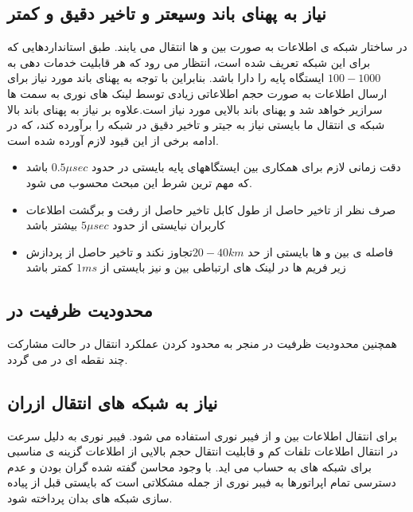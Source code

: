 \subsection{نیاز به پهنای باند وسیعتر و تاخیر
دقیق و کمتر}
در ساختار شبکه ی  اطلاعات به صورت  بین
  و   ها انتقال می یابند. طبق استانداردهایی
که برای این شبکه تعریف شده است، انتظار می رود که
هر  قابلیت خدمات دهی به $100-1000$
ایستگاه پایه را دارا باشد. بنابراین با توجه به پهنای
باند مورد نیاز برای ارسال اطلاعات به صورت  حجم
اطلاعاتی زیادی توسط لینک های نوری به سمت 
  ها سرازیر خواهد شد و پهنای باند بالایی مورد نیاز
است.علاوه بر نیاز به پهنای باند بالا شبکه ی انتقال ما
بایستی نیاز به جیتر و تاخیر دقیق در شبکه را برآورده کند،
که در ادامه برخی از این قیود لازم آورده شده است.
\begin{itemize}
\item
دقت زمانی لازم برای همکاری بین ایستگاههای پایه
بایستی در حدود $ 0.5 \mu sec$ باشد که مهم ترین شرط
این مبحث محسوب می شود.
\item
صرف نظر از تاخیر حاصل از طول
کابل تاخیر حاصل از رفت و برگشت اطلاعات کاربران
نبایستی از حدود $ 5 \mu sec$ بیشتر باشد
\item
فاصله ی بین  و  ها بایستی از حد 
 $ 20 - 40 km$تجاوز نکند و تاخیر حاصل از پردازش زیر
 فریم ها در لینک های ارتباطی بین   و  نیز
بایستی از $1ms$ کمتر باشد
\end{itemize}
\subsection{محدودیت ظرفیت در }
همچنین محدودیت ظرفیت در  منجر به محدود کردن عملکرد انتقال در حالت مشارکت چند نقطه ای  در   می گردد. 
\subsection{نیاز به شبکه های انتقال ازران}
برای انتقال اطلاعات بین  و  از فیبر نوری
استفاده می شود. فیبر نوری به دلیل سرعت در انتقال
اطلاعات تلفات کم و قابلیت انتقال حجم بالایی از
اطلاعات گزینه ی مناسبی برای شبکه های  به
حساب می اید. با وجود محاسن گفته شده گران بودن و
عدم دسترسی تمام اپراتورها به فیبر نوری از جمله مشکلاتی
است که بایستی قبل از پیاده سازی شبکه های  بدان
پرداخته شود. \cite{MA}
